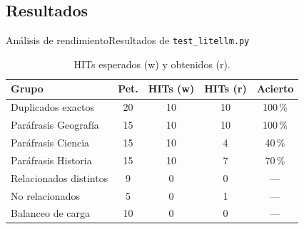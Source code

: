 \subsection{Resultados}
\begin{frame}{Análisis de rendimiento}{Resultados de \texttt{test\_litellm.py}}
\begin{table}[H]
    \centering
    \caption{HITs esperados (w) y obtenidos (r).}
    \label{tab:resultados}
    \hspace{-0.2cm}

    \begin{tabular}{lcccc}
        \toprule
        \textbf{Grupo} & \textbf{Pet.} & \textbf{HITs (w)} & \textbf{HITs (r)} & \textbf{Acierto} \\
        \midrule
        Duplicados exactos      & 20 & 10 & 10 & 100\,\% \\
        Paráfrasis Geografía    & 15 & 10 & 10 & 100\,\% \\
        Paráfrasis Ciencia      & 15 & 10 &  4 &  40\,\% \\
        Paráfrasis Historia     & 15 & 10 &  7 &  70\,\% \\
        Relacionados distintos  &  9 &  0 &  0 &   --- \\
        No relacionados         &  5 &  0 &  1 & ---    \\
        Balanceo de carga       & 10 &  0 &  0 & ---    \\
        \bottomrule
    \end{tabular}

\end{table}

\end{frame}
